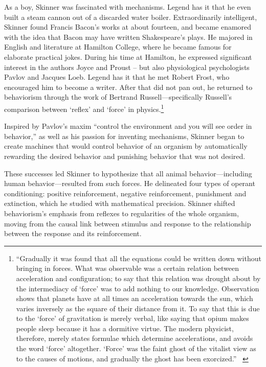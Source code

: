 \begin{refsection}
As a boy, Skinner was fascinated with mechanisms. Legend has it that he even built a steam cannon out of a discarded water boiler. Extraordinarily intelligent, Skinner found Francis Bacon's works at about fourteen, and became enamored with the idea that Bacon may have written Shakespeare's plays. He majored in English and literature at Hamilton College, where he became famous for elaborate practical jokes. During his time at Hamilton, he expressed significant interest in the authors Joyce and Proust – but also physiological psychologists Pavlov and Jacques Loeb. Legend has it that he met Robert Frost, who encouraged him to become a writer. After that did not pan out, he returned to behaviorism through the work of Bertrand Russell---specifically Russell's comparison between `reflex' and `force' in physics.\footnote{“Gradually it was found that all the equations could be written down without bringing in forces. What was observable was a certain relation between acceleration and configuration; to say that this relation was drought about by the intermediacy of `force' was to add nothing to our knowledge. Observation shows that planets have at all times an acceleration towards the sun, which varies inversely as the square of their distance from it. To say that this is due to the `force' of gravitation is merely verbal, like saying that opium makes people sleep because it has a dormitive virtue. The modern physicist, therefore, merely states formulae which determine accelerations, and avoids the word `force' altogether. `Force' was the faint ghost of the vitalist view as to the causes of motions, and gradually the ghost has been exorcized.” ~\citep[p 495]{Russell:2013wy}}

Inspired by Pavlov's maxim “control the environment and you will see order in behavior,” as well as his passion for inventing mechanisms, Skinner began to create machines that would control behavior of an organism by automatically rewarding the desired behavior and punishing behavior that was not desired.

These successes led Skinner to hypothesize that all animal behavior---including human behavior---resulted from such forces. He delineated four types of operant conditioning: positive reinforcement, negative reinforcement, punishment and extinction, which he studied with mathematical precision. Skinner shifted behaviorism's emphasis from reflexes to regularities of the whole organism, moving from the causal link between stimulus and response to the relationship between the response and its reinforcement.


\end{refsection}
